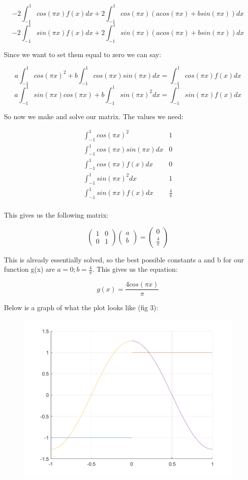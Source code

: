 \documentclass[]{article}
\begin{document}
\[
-2\int_{-1}^{1} cos(\pi x)f(x)dx + 2\int_{-1}^{1}cos(\pi x)(acos(\pi x)+bsin(\pi x))dx
\] \[
-2\int_{-1}^{1} sin(\pi x)f(x)dx +2\int_{-1}^{1}sin(\pi x)(acos(\pi x)+bsin(\pi x))dx
\]

Since we want to set them equal to zero we can say:

\[
a\int_{-1}^{1}cos(\pi x)^2+b\int_{-1}^{1}cos(\pi x)sin(\pi x)dx=\int_{-1}^{1} cos(\pi x)f(x)dx
\] \[
a\int_{-1}^{1}sin(\pi x)cos(\pi x)+b\int_{-1}^{1}sin(\pi x)^2dx=\int_{-1}^{1} sin(\pi x)f(x)dx
\]

So now we make and solve our matrix. The values we need:

\[
\begin{array}{c|c|} 
\int_{-1}^{1}cos(\pi x)^2 & 1\\
\int_{-1}^{1}cos(\pi x)sin(\pi x)dx & 0\\
\int_{-1}^{1} cos(\pi x)f(x)dx & 0\\
\int_{-1}^{1}sin(\pi x)^2dx & 1\\
\int_{-1}^{1} sin(\pi x)f(x)dx & \frac4{\pi}\\
\end{array}
\]

This gives us the following matrix:

\[
\left(\begin{array}{cc} 
1 & 0\\
0 & 1
\end{array}\right)
\left(\begin{array}{c} 
a \\
b 
\end{array}\right) =
\left(\begin{array}{c}
0 \\
\frac4{\pi} 
\end{array}\right)
\]

This is already essentially solved, so the best possible constants a and
b for our function g(x) are \(a=0;b=\frac4{\pi}\). This gives us the
equation:

\[g(x) = \frac{4cos(\pi x)}{\pi}\]

Below is a graph of what the plot looks like (fig 3):

\begin{figure}
\centering
\includegraphics{./Problem7Figure.png}
\caption{}
\end{figure}
\end{document}
